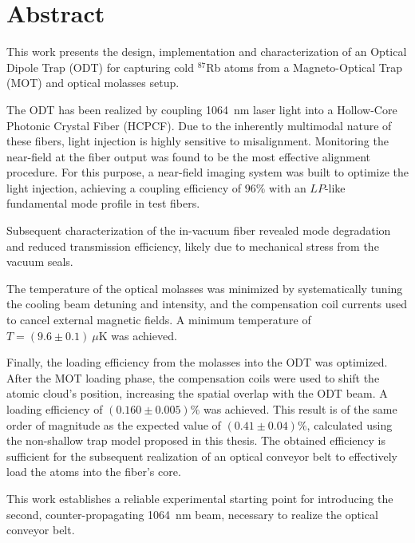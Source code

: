 \documentclass[../../thesis_main.tex]{subfiles}
\begin{document}
    \chapter*{Abstract}
    This work presents the design, implementation and characterization of an Optical Dipole Trap (ODT) for capturing cold $^{87}$Rb atoms from a Magneto-Optical Trap (MOT) and optical molasses setup. 

    The ODT has been realized by coupling 1064~nm laser light into a Hollow-Core Photonic Crystal Fiber (HCPCF). Due to the inherently multimodal nature of these fibers, light injection is highly sensitive to misalignment. Monitoring the near-field at the fiber output was found to be the most effective alignment procedure. For this purpose, a near-field imaging system was built to optimize the light injection, achieving a coupling efficiency of $96\%$ with an $LP$-like fundamental mode profile in test fibers.

    Subsequent characterization of the in-vacuum fiber revealed mode degradation and reduced transmission efficiency, likely due to mechanical stress from the vacuum seals.

    The temperature of the optical molasses was minimized by systematically tuning the cooling beam detuning and intensity, and the compensation coil currents used to cancel external magnetic fields. A minimum temperature of $T = (9.6 \pm 0.1)~\mu\text{K}$ was achieved.

    Finally, the loading efficiency from the molasses into the ODT was optimized. After the MOT loading phase, the compensation coils were used to shift the atomic cloud's position, increasing the spatial overlap with the ODT beam. A loading efficiency of $(0.160\pm 0.005)\%$ was achieved. This result is of the same order of magnitude as the expected value of $(0.41 \pm 0.04)\%$, calculated using the non-shallow trap model proposed in this thesis. The obtained efficiency is sufficient for the subsequent realization of an optical conveyor belt to effectively load the atoms into the fiber's core.

    This work establishes a reliable experimental starting point for introducing the second, counter-propagating 1064~nm beam, necessary to realize the optical conveyor belt.
\end{document}

